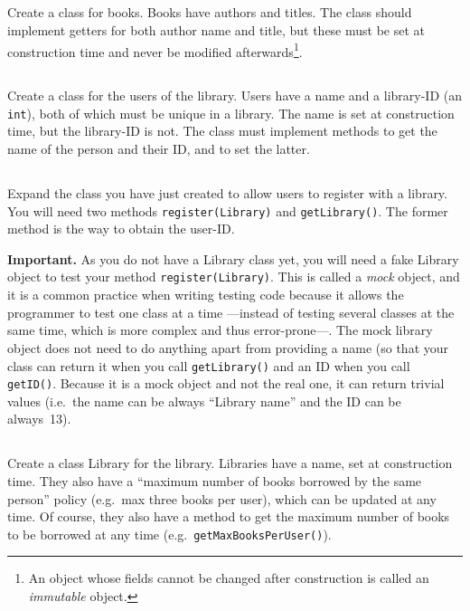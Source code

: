 \documentclass{article}
\begin{document}
\subsection{}

Create a class for books. Books have authors and titles. The class
should implement getters for both author name and title, but these
must be set at construction time and never be modified
afterwards\footnote{An object whose fields cannot be changed after
  construction is called an \emph{immutable} object.}.

\subsection{}

Create a class for the users of the library. Users have a name and a
library-ID (an \verb+int+), 
both of which must be unique in a library. The name is
set at construction time, but the library-ID is not. 
The class must implement methods to get the
name of the person and their ID, and to set the latter. 

\subsection{}

Expand the class you have just created to allow users to register with
a library. You will need two methods \verb+register(Library)+
and \verb+getLibrary()+. The former method is the way to obtain the
user-ID. 

\textbf{Important.} As you do not have a Library class yet, you will need a fake
Library object to test your method \verb+register(Library)+. This is called a
\emph{mock} object, and it is a common practice when writing testing
code because it allows the programmer to test one class at a time
---instead of testing several classes at the same time, which is more
complex and thus error-prone---. 
The mock library object does not need to do anything apart from
providing a name (so that your class can return it when you call
\verb+getLibrary()+ and an ID when you call \verb+getID()+. Because it
is a mock object and not the real one, it can return trivial values
(i.e.~the name can be always ``Library name'' and the ID can be
always~13).  

\subsection{}

Create a class Library for the library. Libraries have a name, set at
construction time. They also have a ``maximum number of books borrowed
by the same person'' policy (e.g.~max three books per user), 
which can be updated at any time. Of
course, they also have a method to get the maximum number of books to
be borrowed at any time (e.g.~\verb+getMaxBooksPerUser()+). 
\end{document}
